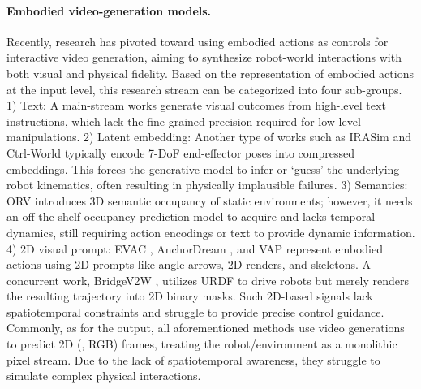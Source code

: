 \paragraph{Embodied video-generation models.}
Recently, research has pivoted toward using embodied actions as controls for interactive video generation, aiming to synthesize robot-world interactions with both visual and physical fidelity. Based on the representation of embodied actions at the input level, this research stream can be categorized into four sub-groups.
1) Text: A main-stream works \cite{robodreamer,yang2024learning,robomaster,chen2025world4omni,yang2025roboenvision} generate visual outcomes from high-level text instructions, which lack the fine-grained precision required for low-level manipulations.
2) Latent embedding: Another type of works \cite{wu2024ivideogpt,cen2025worldvla,cen2025rynnvla,huang2025ladi,luo2025learning,zhang2025imowm,zhu2025irasim,agarwal2025cosmos,gao2026dreamdojo,liao2026genie,guo2026ctrl} such as IRASim \cite{zhu2025irasim} and Ctrl-World \cite{guo2026ctrl} typically encode 7-DoF end-effector poses into compressed embeddings. This forces the generative model to infer or `guess' the underlying robot kinematics, often resulting in physically implausible failures.
3) Semantics: ORV \cite{yang2026orv} introduces 3D semantic occupancy of static environments; however, it needs an off-the-shelf occupancy-prediction model to acquire and lacks temporal dynamics, still requiring action encodings or text to provide dynamic information.
4) 2D visual prompt: EVAC \cite{jiang2025enerverse}, AnchorDream \cite{ye2025anchordream}, and VAP \cite{VAP_2025_ICCV} represent embodied actions using 2D prompts like angle arrows, 2D renders, and skeletons. A concurrent work, BridgeV2W \cite{chen2026bridgev2wbridgingvideogeneration}, utilizes URDF to drive robots but merely renders the resulting trajectory into 2D binary masks. Such 2D-based signals lack spatiotemporal constraints and struggle to provide precise control guidance.
Commonly, as for the output, all aforementioned methods use video generations to predict 2D (\ie, RGB) frames, treating the robot/environment as a monolithic pixel stream. Due to the lack of spatiotemporal awareness, they struggle to simulate complex physical interactions. 

